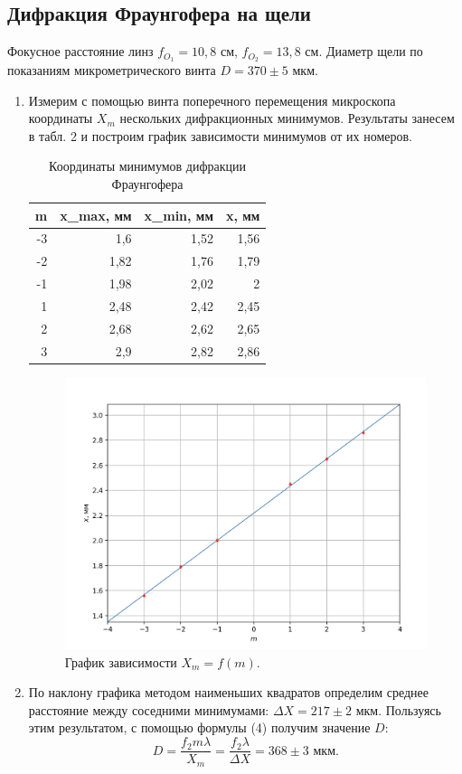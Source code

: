 \documentclass{article}
\begin{document}
\subsection{Дифракция Фраунгофера на щели}
 Фокусное расстояние линз $f_{O_1} = 10{,}8$ см, $f_{O_2} = 13{,}8$ см. Диаметр щели по показаниям микрометрического винта $D = 370\pm5$ мкм.
 \begin{enumerate}
     \item
Измерим с помощью винта поперечного перемещения микроскопа координаты $ X_m $ нескольких дифракционных минимумов. Результаты занесем в табл. 2 и построим график зависимости минимумов от их номеров. 
 
	\begin{table}[h!]
\centering
{%
\begin{tabular}{|r|r|r|r|}
\hline
\multicolumn{1}{|l|}{\textbf{m}} & \multicolumn{1}{l|}{\textbf{x_{max}, мм}} & \multicolumn{1}{l|}{\cellcolor[HTML]{FFFFFF}\textbf{x_{min}, мм}} & \multicolumn{1}{l|}{\textbf{x, мм}} \\ \hline
-3 & 1,6 & 1,52 & 1,56 \\ \hline
-2 & 1,82 & 1,76 & 1,79 \\ \hline
-1 & 1,98 & 2,02 & 2 \\ \hline
1 & 2,48 & 2,42 & 2,45 \\ \hline
2 & 2,68 & 2,62 & 2,65 \\ \hline
3 & 2,9 & 2,82 & 2,86 \\ \hline
\end{tabular}%
}
\caption{Координаты минимумов дифракции Фраунгофера}
\label{tab:my-table}
\end{table}

\begin{figure}[h!]
    \centering
    \includegraphics[width=11cm]{4.3.1(2).png}
    \caption{График зависимости $X_m = f(m)$.}
    \label{fig:vac}
\end{figure}


	\item По наклону графика методом наименьших квадратов определим среднее расстояние между соседними минимумами: $\Delta X = 217 \pm 2$ мкм. Пользуясь этим результатом, с помощью формулы (4) получим значение $D$:
	\begin{equation*}
	D = \dfrac{f_2m\lambda}{X_m} = \dfrac{f_2 \lambda}{\Delta X} = 368\pm3\text{ мкм}.
	\end{equation*}
\end{enumerate}
 \newpage
\end{document}
